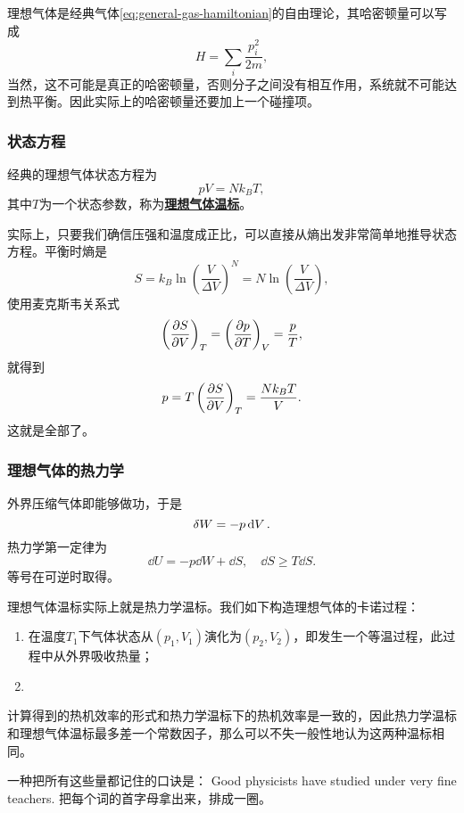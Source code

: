 \documentclass[hyperref, UTF8, a4paper]{ctexart}
\newcommand{\concept}[1]{\underline{\textbf{#1}}}
\begin{document}
理想气体是经典气体\eqref{eq:general-gas-hamiltonian}的自由理论，其哈密顿量可以写成
\begin{equation}
    H = \sum_i \frac{p_i^2}{2m},
\end{equation}
当然，这不可能是真正的哈密顿量，否则分子之间没有相互作用，系统就不可能达到热平衡。因此实际上的哈密顿量还要加上一个碰撞项。

\subsubsection{状态方程}

经典的理想气体状态方程为
\begin{equation}
    pV=N k_B T,
\end{equation}
其中$T$为一个状态参数，称为\concept{理想气体温标}。

实际上，只要我们确信压强和温度成正比，可以直接从熵出发非常简单地推导状态方程。平衡时熵是
\[
    S = k_B \ln \left(\frac{V}{\Delta V}\right)^N = N \ln \left( \frac{V}{\Delta V} \right),
\]
使用麦克斯韦关系式
\[
    \left( \pdv{S}{V} \right)_T = \left( \pdv{p}{T} \right)_V = \frac{p}{T},
\]
就得到
\[
    p = T \left( \pdv{S}{V} \right)_T = \frac{N k_B T}{V}.
\]
这就是全部了。

\subsubsection{理想气体的热力学}

外界压缩气体即能够做功，于是
\begin{equation}
    \var{W} = - p \dd{V}.
\end{equation}
热力学第一定律为
\begin{equation}
    \dd{U} = - p \dd{W} + \dd{S}, \quad \dd{S} \geq T \dd{S}.
\end{equation}
等号在可逆时取得。

理想气体温标实际上就是热力学温标。我们如下构造理想气体的卡诺过程：
\begin{enumerate}
    \item 在温度$T_1$下气体状态从$(p_1, V_1)$演化为$(p_2, V_2)$，即发生一个等温过程，此过程中从外界吸收热量；
    \item 
\end{enumerate}

计算得到的热机效率的形式和热力学温标下的热机效率是一致的，因此热力学温标和理想气体温标最多差一个常数因子，那么可以不失一般性地认为这两种温标相同。

一种把所有这些量都记住的口诀是：
Good physicists have studied under very fine teachers.
把每个词的首字母拿出来，排成一圈。
\end{document}
